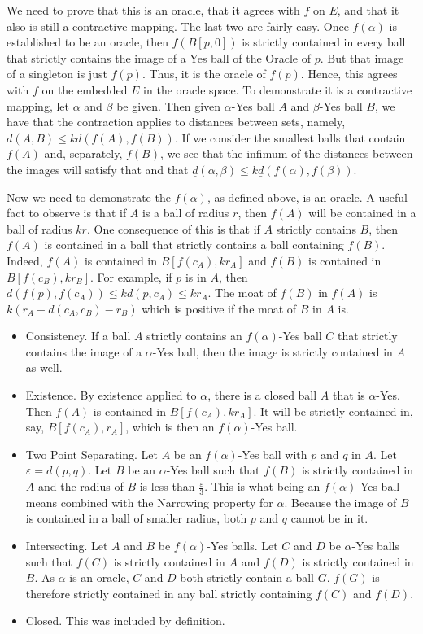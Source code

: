 \documentclass[12pt]{article}
\begin{document}
We need to prove that this is an oracle, that it agrees with $f$ on $E$, and that it also is still a contractive mapping. The last two are fairly easy. Once $f(\alpha)$ is established to be an oracle, then $f(B[p, 0])$ is strictly contained in every ball that strictly contains the image of a Yes ball of the Oracle of $p$. But that image of a singleton is just $f(p)$. Thus, it is the oracle of $f(p)$. Hence, this agrees with $f$ on the embedded $E$ in the oracle space. To demonstrate it is a contractive mapping, let $\alpha$ and $\beta$ be given. Then given $\alpha$-Yes ball $A$ and $\beta$-Yes ball $B$, we have that the contraction applies to distances between sets, namely, $d(A,B) \leq k d(f(A), f(B))$. If we consider the smallest balls that contain $f(A)$ and, separately, $f(B)$, we see that the infimum of the distances between the images will satisfy that and that $\underline{d}(\alpha, \beta) \leq k \underline{d}(f(\alpha), f(\beta)) $.

Now we need to demonstrate the $f(\alpha)$, as defined above, is an oracle. A useful fact to observe is that if $A$ is a ball of radius $r$, then $f(A)$ will be contained in a ball of radius $kr$. One consequence of this is that if $A$ strictly contains $B$, then $f(A)$ is contained in a ball that strictly contains a ball containing $f(B)$. Indeed, $f(A)$ is contained in $B[f(c_A), kr_A]$ and $f(B)$ is contained in $B[f(c_B), kr_B]$. For example, if $p$ is in $A$, then $d(f(p), f(c_A)) \leq k d(p, c_A) \leq k r_A$.  The moat of $f(B)$ in $f(A)$ is $k(r_A - d(c_A, c_B) - r_B)$ which is positive if the moat of $B$ in $A$ is. 

\begin{itemize}
    \item Consistency. If a ball $A$ strictly contains an $f(\alpha)$-Yes ball $C$ that strictly contains the image of a $\alpha$-Yes ball, then the image is strictly contained in $A$ as well.
    \item Existence. By existence applied to $\alpha$, there is a closed ball $A$ that is $\alpha$-Yes. Then $f(A)$ is contained in $B[f(c_A), kr_A]$. It will be strictly contained in, say, $B[f(c_A), r_A]$, which is then an $f(\alpha)$-Yes ball. 
    \item Two Point Separating. Let $A$ be an $f(\alpha)$-Yes ball with $p$ and $q$ in $A$. Let $\varepsilon= d(p, q)$. Let $B$ be an $\alpha$-Yes ball such that $f(B)$ is strictly contained in $A$ and the radius of $B$ is less than $\frac{\varepsilon}{3}$. This is what being an $f(\alpha)$-Yes ball means combined with the Narrowing property for $\alpha$. Because the image of $B$ is contained in a ball of smaller radius, both $p$ and $q$ cannot be in it. 
    \item Intersecting. Let $A$ and $B$ be $f(\alpha)$-Yes balls. Let $C$ and $D$ be $\alpha$-Yes balls such that $f(C)$ is strictly contained in $A$ and $f(D)$ is strictly contained in $B$. As $\alpha$ is an oracle, $C$ and $D$ both strictly contain a ball $G$. $f(G)$ is therefore strictly contained in any ball strictly containing $f(C)$ and $f(D)$.
    \item Closed. This was included by definition. 
\end{itemize}
\end{document}

